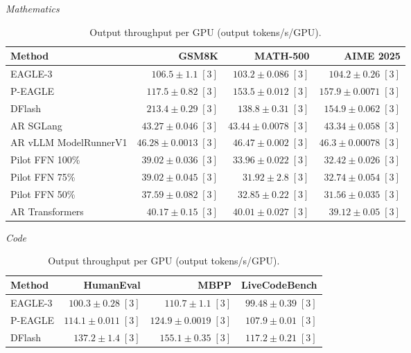 \documentclass[conference,onecolumn]{IEEEtran}
\begin{document}
\begin{table}[!htp]
\centering\small
\setlength{\tabcolsep}{3pt}
\caption{Output throughput per GPU (output tokens/s/GPU).}
\label{tab:appendix-metric-per-gpu-throughput-none}
\textit{Mathematics}\par\smallskip
\begin{tabular}{@{}>{\raggedright\arraybackslash}p{3.7cm}rrr@{}}
\toprule
Method & GSM8K & MATH-500 & AIME 2025 \\
\midrule
EAGLE-3 & \(106.5 \pm 1.1\;[3]\) & \(103.2 \pm 0.086\;[3]\) & \(104.2 \pm 0.26\;[3]\) \\
P-EAGLE & \(117.5 \pm 0.82\;[3]\) & \(\mathbf{153.5} \pm 0.012\;[3]\) & \(\mathbf{157.9} \pm 0.0071\;[3]\) \\
DFlash & \(\mathbf{213.4} \pm 0.29\;[3]\) & \(138.8 \pm 0.31\;[3]\) & \(154.9 \pm 0.062\;[3]\) \\
AR \textperiodcentered{} SGLang & \(43.27 \pm 0.046\;[3]\) & \(43.44 \pm 0.0078\;[3]\) & \(43.34 \pm 0.058\;[3]\) \\
AR \textperiodcentered{} vLLM ModelRunnerV1 & \(46.28 \pm 0.0013\;[3]\) & \(46.47 \pm 0.002\;[3]\) & \(46.3 \pm 0.00078\;[3]\) \\
Pilot FFN 100\% & \(39.02 \pm 0.036\;[3]\) & \(33.96 \pm 0.022\;[3]\) & \(32.42 \pm 0.026\;[3]\) \\
Pilot FFN 75\% & \(39.02 \pm 0.045\;[3]\) & \(31.92 \pm 2.8\;[3]\) & \(32.74 \pm 0.054\;[3]\) \\
Pilot FFN 50\% & \(37.59 \pm 0.082\;[3]\) & \(32.85 \pm 0.22\;[3]\) & \(31.56 \pm 0.035\;[3]\) \\
AR \textperiodcentered{} Transformers & \(40.17 \pm 0.15\;[3]\) & \(40.01 \pm 0.027\;[3]\) & \(39.12 \pm 0.05\;[3]\) \\
\bottomrule
\end{tabular}\par\medskip
\textit{Code}\par\smallskip
\begin{tabular}{@{}>{\raggedright\arraybackslash}p{3.7cm}rrr@{}}
\toprule
Method & HumanEval & MBPP & LiveCodeBench \\
\midrule
EAGLE-3 & \(100.3 \pm 0.28\;[3]\) & \(110.7 \pm 1.1\;[3]\) & \(99.48 \pm 0.39\;[3]\) \\
P-EAGLE & \(114.1 \pm 0.011\;[3]\) & \(124.9 \pm 0.0019\;[3]\) & \(107.9 \pm 0.01\;[3]\) \\
DFlash & \(\mathbf{137.2} \pm 1.4\;[3]\) & \(\mathbf{155.1} \pm 0.35\;[3]\) & \(\mathbf{117.2} \pm 0.21\;[3]\) \\

\end{tabular}
\end{table}
\end{document}
